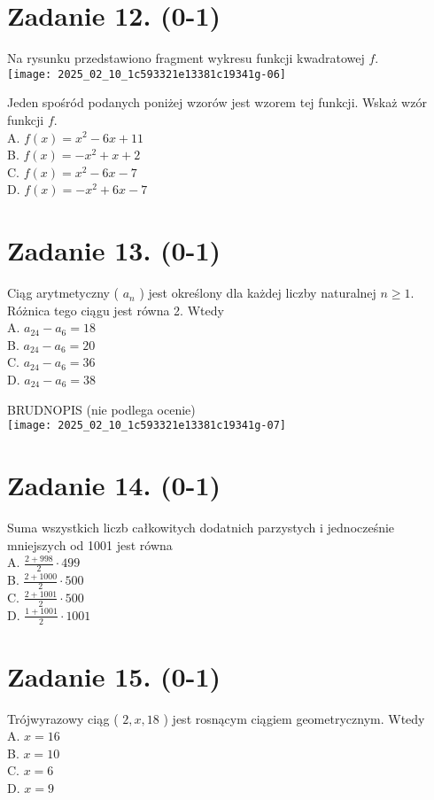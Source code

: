 \documentclass[10pt]{article}
\begin{document}
\section*{Zadanie 12. (0-1)}
Na rysunku przedstawiono fragment wykresu funkcji kwadratowej \(f\).\\
\texttt{[image: 2025\_02\_10\_1c593321e13381c19341g-06]}

Jeden spośród podanych poniżej wzorów jest wzorem tej funkcji. Wskaż wzór funkcji \(f\).\\
A. \(f(x)=x^{2}-6 x+11\)\\
B. \(f(x)=-x^{2}+x+2\)\\
C. \(f(x)=x^{2}-6 x-7\)\\
D. \(f(x)=-x^{2}+6 x-7\)

\section*{Zadanie 13. (0-1)}
Ciąg arytmetyczny ( \(a_{n}\) ) jest określony dla każdej liczby naturalnej \(n \geq 1\). Różnica tego ciągu jest równa 2. Wtedy\\
A. \(a_{24}-a_{6}=18\)\\
B. \(a_{24}-a_{6}=20\)\\
C. \(a_{24}-a_{6}=36\)\\
D. \(a_{24}-a_{6}=38\)

BRUDNOPIS (nie podlega ocenie)\\
\texttt{[image: 2025\_02\_10\_1c593321e13381c19341g-07]}

\section*{Zadanie 14. (0-1)}
Suma wszystkich liczb całkowitych dodatnich parzystych i jednocześnie mniejszych od 1001 jest równa\\
A. \(\frac{2+998}{2} \cdot 499\)\\
B. \(\frac{2+1000}{2} \cdot 500\)\\
C. \(\frac{2+1001}{2} \cdot 500\)\\
D. \(\frac{1+1001}{2} \cdot 1001\)

\section*{Zadanie 15. (0-1)}
Trójwyrazowy ciąg ( \(2, x, 18\) ) jest rosnącym ciągiem geometrycznym. Wtedy\\
A. \(x=16\)\\
B. \(x=10\)\\
C. \(x=6\)\\
D. \(x=9\)
\end{document}
